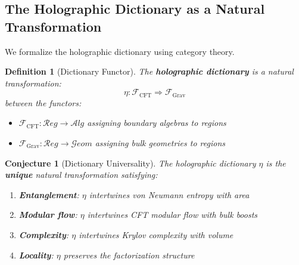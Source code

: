 \documentclass[12pt,a4paper]{article}
\newtheorem{conjecture}[theorem]{Conjecture}
\newtheorem{definition}[theorem]{Definition}
\begin{document}
\subsection{The Holographic Dictionary as a Natural Transformation}

We formalize the holographic dictionary using category theory.

\begin{definition}[Dictionary Functor]
The \textbf{holographic dictionary} is a natural transformation:
\begin{equation}
\eta: \mathcal{F}_{\text{CFT}} \Rightarrow \mathcal{F}_{\text{Grav}}
\end{equation}
between the functors:
\begin{itemize}
    \item $\mathcal{F}_{\text{CFT}}: \mathcal{R}eg \to \mathcal{A}lg$ assigning boundary algebras to regions
    \item $\mathcal{F}_{\text{Grav}}: \mathcal{R}eg \to \mathcal{G}eom$ assigning bulk geometries to regions
\end{itemize}
\end{definition}

\begin{conjecture}[Dictionary Universality]
The holographic dictionary $\eta$ is the \textbf{unique} natural transformation satisfying:
\begin{enumerate}
    \item \textbf{Entanglement}: $\eta$ intertwines von Neumann entropy with area
    \item \textbf{Modular flow}: $\eta$ intertwines CFT modular flow with bulk boosts
    \item \textbf{Complexity}: $\eta$ intertwines Krylov complexity with volume
    \item \textbf{Locality}: $\eta$ preserves the factorization structure
\end{enumerate}
\end{conjecture}
\end{document}
